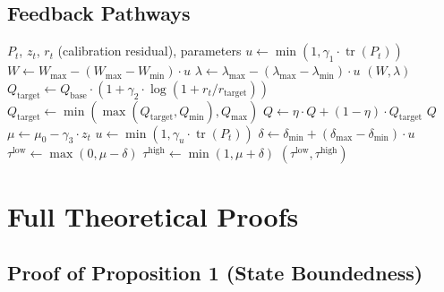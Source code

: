 \documentclass[12pt,a4paper]{article}
\newcommand{\tr}{\operatorname{tr}}
\begin{document}
\subsection{Feedback Pathways}

\begin{algorithm}[h]
\caption{Feedback Pathways F1, F2, F3}
\label{alg:feedback}
\begin{algorithmic}[1]
\Require $P_t$, $z_t$, $r_t$ (calibration residual), parameters
\Statex
{}
    \State $u \gets \min(1, \gamma_1 \cdot \tr(P_t))$
    \State $W \gets W_{\max} - (W_{\max} - W_{\min}) \cdot u$
    \State $\lambda \gets \lambda_{\max} - (\lambda_{\max} - \lambda_{\min}) \cdot u$
    \State \Return $(W, \lambda)$
\EndFunction
\Statex
{}
    \State $Q_{\text{target}} \gets Q_{\text{base}} \cdot (1 + \gamma_2 \cdot \log(1 + r_t / r_{\text{target}}))$
    \State $Q_{\text{target}} \gets \min(\max(Q_{\text{target}}, Q_{\min}), Q_{\max})$
    \State $Q \gets \eta \cdot Q + (1-\eta) \cdot Q_{\text{target}}$ 
    \State \Return $Q$
\EndFunction
\Statex
{}
    \State $\mu \gets \mu_0 - \gamma_3 \cdot z_t$
    \State $u \gets \min(1, \gamma_u \cdot \tr(P_t))$
    \State $\delta \gets \delta_{\min} + (\delta_{\max} - \delta_{\min}) \cdot u$
    \State $\tau^{\text{low}} \gets \max(0, \mu - \delta)$
    \State $\tau^{\text{high}} \gets \min(1, \mu + \delta)$
    \State \Return $(\tau^{\text{low}}, \tau^{\text{high}})$
\EndFunction
\end{algorithmic}
\end{algorithm}

\section{Full Theoretical Proofs}

\subsection{Proof of Proposition 1 (State Boundedness)}
\end{document}
